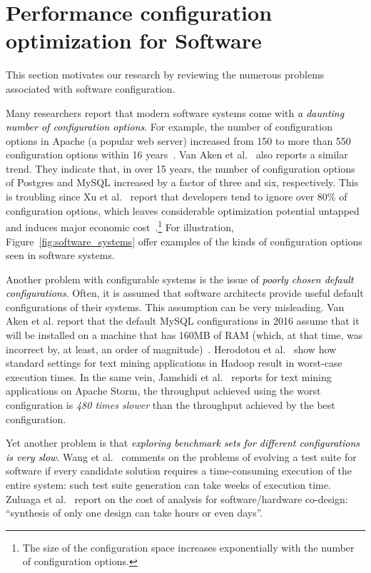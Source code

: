 \documentclass[10pt,journal,compsoc]{IEEEtran}
\newcommand{\fig}[1]{Figure~\ref{fig:#1}}
\begin{document}
\section{Performance configuration optimization for Software} \label{sec:perf_opt}

 This section  motivates our research by 
 reviewing the numerous problems associated with 
  software configuration.

Many researchers report that modern software systems come with \textcolor{black}{{\em a daunting number of configuration options}}. 
For example, the number of configuration options in Apache (a popular web server) increased from 150 to more than 550 configuration options within 16 years~\cite{xu2015hey}. 
Van Aken et al.~\cite{van2017automatic} also reports a similar trend. They indicate that, in over 15 years, the number of configuration options of {\sc Postgres} and {\sc MySQL} increased by a factor of three and six, respectively.
This is troubling since
Xu et al.~\cite{xu2015hey} report that developers tend to ignore over 80\% of configuration options, which leaves considerable optimization potential untapped and induces major economic cost~\cite{xu2015hey}.\footnote{The size of the configuration space increases exponentially  with the number of configuration options.} 
For illustration, \fig{software_systems} offer examples of the kinds of configuration options seen in software systems. 



Another problem  with configurable
systems is the issue of  \textcolor{black}{{\em poorly chosen default configurations}}.
Often, it is assumed that software architects provide useful default configurations of their systems.  This assumption can be very
misleading.   Van Aken et al. report that the default MySQL configurations in 2016 assume that it will be installed on a machine that has  160MB of RAM (which, at that
time, was incorrect by, at least, an order of magnitude)~\cite{van2017automatic}. Herodotou et al.~\cite{herodotou2011starfish} show how standard settings for text mining
applications in Hadoop result in worst-case execution times.
In the same vein,  
Jamshidi et al.~\cite{jamshidi2016uncertainty} reports for
 text mining applications on Apache Storm, the throughput achieved using the worst configuration is 
{\em 480 times slower} than the throughput achieved by the best configuration.

Yet another  problem
is that 
\textcolor{black}{{\em  exploring benchmark sets for different configurations is very slow}}. 
Wang et al.~\cite{wang2013searching} comments on the problems of evolving a test suite for software if every candidate solution requires a time-consuming execution of the entire system: such test suite generation can take weeks of execution time.
Zuluaga et al.~\cite{zuluaga2013active} report on the cost of analysis for software/hardware co-design: ``synthesis of only one design can take hours or even days''. 
\end{document}
